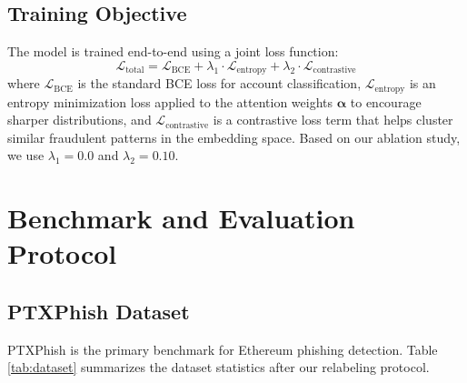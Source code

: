 \documentclass[conference]{IEEEtran}
\begin{document}
\subsection{Training Objective}
The model is trained end-to-end using a joint loss function:
\begin{equation}
\mathcal{L}_{\text{total}} = \mathcal{L}_{\text{BCE}} + \lambda_1 \cdot \mathcal{L}_{\text{entropy}} + \lambda_2 \cdot \mathcal{L}_{\text{contrastive}}
\end{equation}
where $\mathcal{L}_{\text{BCE}}$ is the standard BCE loss for account classification, $\mathcal{L}_{\text{entropy}}$ is an entropy minimization loss applied to the attention weights $\boldsymbol{\alpha}$ to encourage sharper distributions, and $\mathcal{L}_{\text{contrastive}}$ is a contrastive loss term that helps cluster similar fraudulent patterns in the embedding space. Based on our ablation study, we use $\lambda_1=0.0$ and $\lambda_2=0.10$.

\section{Benchmark and Evaluation Protocol}

\subsection{PTXPhish Dataset}
PTXPhish \cite{ptxphish} is the primary benchmark for Ethereum phishing detection. Table \ref{tab:dataset} summarizes the dataset statistics after our relabeling protocol.

\begin{table}[h]
\centering
\caption{Dataset Statistics}
\label{tab:dataset}
\end{table}
\end{document}
